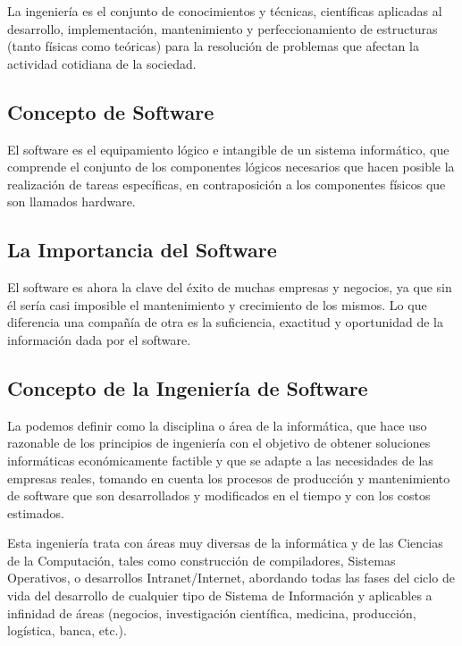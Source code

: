 \documentclass[12pt]{article}
\begin{document}
	\hspace{1.27cm}La ingeniería es el conjunto de conocimientos y técnicas, científicas aplicadas al desarrollo,
	implementación, mantenimiento y perfeccionamiento de estructuras (tanto físicas como teóricas)
	para la resolución de problemas que afectan la actividad cotidiana de la sociedad.

	\subsection*{Concepto de Software}

	\hspace{1.27cm}El software es el equipamiento lógico e intangible de un sistema informático, que comprende el conjunto de los componentes lógicos necesarios que hacen posible la realización de tareas específicas,
	en contraposición a los componentes físicos que son llamados hardware.

	\subsection*{La Importancia del Software}

	\hspace{1.27cm}El software es ahora la clave del éxito de muchas empresas y negocios, ya que sin él sería casi imposible el mantenimiento y crecimiento de los mismos. Lo que diferencia una compañía de otra es la suficiencia, exactitud y oportunidad de la información dada por el software.

	\subsection*{Concepto de la Ingeniería de Software}

	\hspace{1.27cm}La podemos definir como la disciplina o área de la informática, que hace uso razonable de los principios de ingeniería con el objetivo de obtener soluciones informáticas económicamente factible y que se adapte a las necesidades de las empresas reales, tomando en cuenta los procesos de producción y mantenimiento de software que son desarrollados y modificados en el tiempo y con los costos estimados.

	\hspace{1.27cm}Esta ingeniería trata con áreas muy diversas de la informática y de las Ciencias de la Computación, tales como construcción de compiladores, Sistemas Operativos, o desarrollos Intranet/Internet, abordando todas las fases del ciclo de vida del desarrollo de cualquier tipo de Sistema de Información y aplicables a infinidad de áreas (negocios, investigación científica, medicina, producción, logística, banca, etc.).
\end{document}
